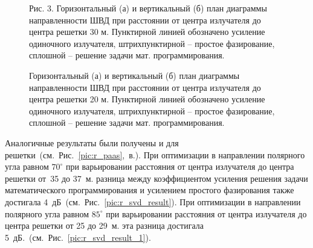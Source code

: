 \begin{figure}
\begin{minipage}[h]{0.49\linewidth}
\end{minipage}
\hfill
\begin{minipage}[h]{0.49\linewidth}
\end{minipage}
\caption{Рис. 3. Горизонтальный (а) и вертикальный (б) план диаграммы направленности ШВД при расстоянии от центра излучателя до центра решетки 30 м. Пунктирной линией обозначено усиление одиночного излучателя, штрихпунктирной – простое фазирование, сплошной – решение задачи мат. программирования.}
\label{pic:r_bvd_result_0}
\end{figure}

\begin{figure}
\begin{minipage}[h]{0.49\linewidth}
\end{minipage}
\hfill
\begin{minipage}[h]{0.49\linewidth}
\end{minipage}
\caption{Горизонтальный (а) и вертикальный (б) план диаграммы направленности ШВД при расстоянии от центра излучателя до центра решетки 20 м. Пунктирной линией обозначено усиление одиночного излучателя, штрихпунктирной – простое фазирование, сплошной – решение задачи мат. программирования.}
\label{pic:r_bvd_result}
\end{figure}

Аналогичные результаты были получены и для решетки~(см.~Рис.~\ref{pic:r_paas},~в.). При оптимизации в направлении полярного угла равном $70^{\circ}$ при варьировании расстояния от центра излучателя до центра решетки от~35 до 37~м. разница между коэффициентом усиления решения задачи математического программирования и усилением простого фазирования также достигала 4~дБ~(см.~Рис.~\ref{pic:r_svd_result}).  При оптимизации в направлении полярного угла равном $85^{\circ}$ при варьировании расстояния от центра излучателя до центра решетки от 25 до 29~м. эта разница достигала 5~дБ.~(см.~Рис.~\ref{pic:r_svd_result_1}).

